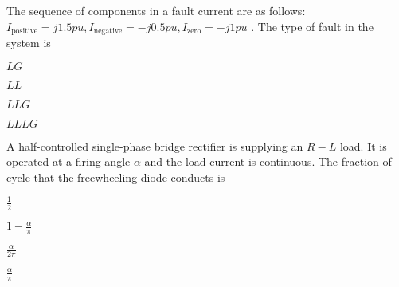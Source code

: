     \item The sequence of components in a fault current are as follows: $I_{\text{positive}}=j1.5pu,I_{\text{negative}}=-j0.5pu, I_{\text{zero}}=-j1pu$ . The type of fault in the system is
        \begin{enumerate}
                \begin{multicols}{2}
                \item $LG$
                    \columnbreak
                \item $LL$
                \end{multicols}
                \begin{multicols}{2}
                \item $LLG$
                    \columnbreak
                \item $LLLG$
                \end{multicols}
        \end{enumerate}
    \item A half-controlled single-phase bridge rectifier is supplying an $R-L$ load. It is operated at a firing angle $\alpha$ and the load current is continuous. The fraction of cycle that the freewheeling diode conducts is
        \begin{enumerate}
                \begin{multicols}{2}
                \item $\frac{1}{2}$
                    \columnbreak
                \item $1-\frac{\alpha}{\pi}$
                \end{multicols}
                \begin{multicols}{2}
                \item $\frac{\alpha}{2\pi}$
                    \columnbreak
                \item $\frac{\alpha}{\pi}$
                \end{multicols}
        \end{enumerate}

